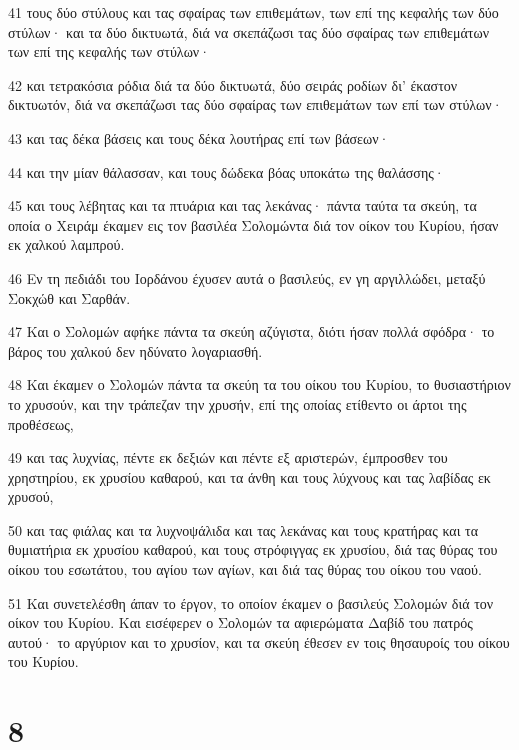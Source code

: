 \par 41 τους δύο στύλους και τας σφαίρας των επιθεμάτων, των επί της κεφαλής των δύο στύλων· και τα δύο δικτυωτά, διά να σκεπάζωσι τας δύο σφαίρας των επιθεμάτων των επί της κεφαλής των στύλων·
\par 42 και τετρακόσια ρόδια διά τα δύο δικτυωτά, δύο σειράς ροδίων δι' έκαστον δικτυωτόν, διά να σκεπάζωσι τας δύο σφαίρας των επιθεμάτων των επί των στύλων·
\par 43 και τας δέκα βάσεις και τους δέκα λουτήρας επί των βάσεων·
\par 44 και την μίαν θάλασσαν, και τους δώδεκα βόας υποκάτω της θαλάσσης·
\par 45 και τους λέβητας και τα πτυάρια και τας λεκάνας· πάντα ταύτα τα σκεύη, τα οποία ο Χειράμ έκαμεν εις τον βασιλέα Σολομώντα διά τον οίκον του Κυρίου, ήσαν εκ χαλκού λαμπρού.
\par 46 Εν τη πεδιάδι του Ιορδάνου έχυσεν αυτά ο βασιλεύς, εν γη αργιλλώδει, μεταξύ Σοκχώθ και Σαρθάν.
\par 47 Και ο Σολομών αφήκε πάντα τα σκεύη αζύγιστα, διότι ήσαν πολλά σφόδρα· το βάρος του χαλκού δεν ηδύνατο λογαριασθή.
\par 48 Και έκαμεν ο Σολομών πάντα τα σκεύη τα του οίκου του Κυρίου, το θυσιαστήριον το χρυσούν, και την τράπεζαν την χρυσήν, επί της οποίας ετίθεντο οι άρτοι της προθέσεως,
\par 49 και τας λυχνίας, πέντε εκ δεξιών και πέντε εξ αριστερών, έμπροσθεν του χρηστηρίου, εκ χρυσίου καθαρού, και τα άνθη και τους λύχνους και τας λαβίδας εκ χρυσού,
\par 50 και τας φιάλας και τα λυχνοψάλιδα και τας λεκάνας και τους κρατήρας και τα θυμιατήρια εκ χρυσίου καθαρού, και τους στρόφιγγας εκ χρυσίου, διά τας θύρας του οίκου του εσωτάτου, του αγίου των αγίων, και διά τας θύρας του οίκου του ναού.
\par 51 Και συνετελέσθη άπαν το έργον, το οποίον έκαμεν ο βασιλεύς Σολομών διά τον οίκον του Κυρίου. Και εισέφερεν ο Σολομών τα αφιερώματα Δαβίδ του πατρός αυτού· το αργύριον και το χρυσίον, και τα σκεύη έθεσεν εν τοις θησαυροίς του οίκου του Κυρίου.

\chapter{8}

